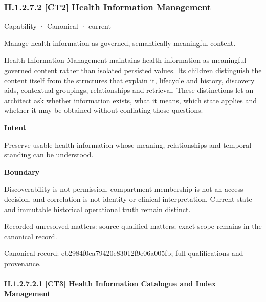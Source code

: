 \subsubsection*{II.1.2.7.2 [CT2] Health Information Management}
\label{navigation:II.1.2.7.2}

\label{element:eb2984f0ca79420e83012f9e06a005fb}
{\small Capability · Canonical · current}\par

Manage health information as governed, semantically meaningful content.



Health Information Management maintains health information as meaningful governed content rather than isolated persisted values. Its children distinguish the content itself from the structures that explain it, lifecycle and history, discovery aids, contextual groupings, relationships and retrieval. These distinctions let an architect ask whether information exists, what it means, which state applies and whether it may be obtained without conflating those questions.



\textbf{Intent}



Preserve usable health information whose meaning, relationships and temporal standing can be understood.



\textbf{Boundary}



Discoverability is not permission, compartment membership is not an access decision, and correlation is not identity or clinical interpretation. Current state and immutable historical operational truth remain distinct.


{\small Recorded unresolved matters: source-qualified matters; exact scope remains in the canonical record.}\par
{\footnotesize \href{../../../../continuum/strategy/capability/eb2984f0ca79420e83012f9e06a005fb.md}{Canonical record: eb2984f0ca79420e83012f9e06a005fb}; full qualifications and provenance.}\par
\paragraph*{II.1.2.7.2.1 [CT3] Health Information Catalogue and Index Management}
\label{navigation:II.1.2.7.2.1}

